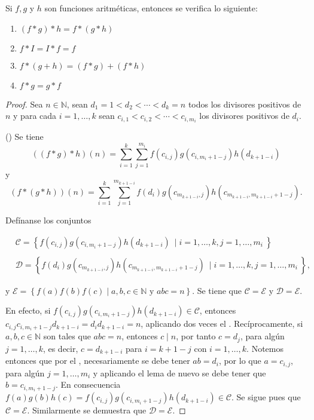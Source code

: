 \begin{proposition}
Si $f,g$ y $h$ son funciones aritméticas, entonces se verifica lo siguiente:

\begin{enumerate}[label=\textnormal{(\roman*)}]
	\item $(f*g)*h=f*(g*h)$
	\item $f*I=I*f=f$
	\item $f*(g+h)=(f*g)+(f*h)$
	\item $f*g=g*f$
\end{enumerate}
\end{proposition}
\begin{proof}
Sea $n\in\mathbb{N}$, sean $d_1=1<d_2<\cdots<d_k=n$ todos los divisores positivos de $n$ y para cada $i=1,\ldots,k$ sean $c_{i,1}<c_{i,2}<\cdots<c_{i,m_i}$ los divisores positivos de $d_i$.
\bigskip

({\scshape {}}) Se tiene
\begin{equation}\label{eqn:sum1}
	((f*g)*h)(n)=\sum_{i=1}^{k} \sum_{j=1}^{m_i} f(c_{i,j})g(c_{i,m_i+1-j})h(d_{k+1-i})
\end{equation}
y 
\begin{equation}\label{eqn:sum2}
	(f*(g*h))(n)=\sum_{i=1}^{k} \sum_{j=1}^{m_{k+1-i}} f(d_i)g(c_{m_{k+1-i},j})h(c_{m_{k+1-i},m_{k+1-i}+1-j}).
\end{equation}

Defínanse los conjuntos

\begin{align*}
	& \mathcal{C} = \left\{f(c_{i,j})g(c_{i,m_i+1-j})h(d_{k+1-i}) \: \mid i=1,\ldots,k,j=1,\ldots,m_i \: \right\} \\
	& \\
	& \mathcal{D} = \left\{f(d_i)g(c_{m_{k+1-i},j})h(c_{m_{k+1-i},m_{k+1-i}+1-j}) \: \mid i=1,\ldots,k,j=1,\ldots,m_i \: \right\},
\end{align*}

y $\mathcal{E} = \left\{f(a)f(b)f(c) \mid a,b,c\in\mathbb{N} \textrm{ y } a b c=n\right\}$. Se tiene que $\mathcal{C}=\mathcal{E}$ y $\mathcal{D}=\mathcal{E}$.
\bigskip

En efecto, si $f(c_{i,j})g(c_{i,m_i+1-j})h(d_{k+1-i}) \in \mathcal{C}$, entonces $c_{i,j}c_{i,m_i+1-j}d_{k+1-i}=d_i d_{k+1-i}=n$, aplicando dos veces el . Recíprocamente, si $a,b,c\in\mathbb{N}$ son tales que $a b c = n$, entonces $c \mid n$, por tanto $c=d_j$, para algún $j=1,\ldots,k$, es decir, $c=d_{k+1-i}$ para $i=k+1-j$ con $i=1,\ldots,k$. Notemos entonces que por el , necesariamente se debe tener $a b=d_i$, por lo que $a=c_{i,j}$, para algún $j=1,\ldots,m_i$ y aplicando el lema de nuevo se debe tener que $b=c_{i,m_i+1-j}$. En consecuencia $f(a)g(b)h(c)=f(c_{i,j})g(c_{i,m_i+1-j})h(d_{k+1-i})\in \mathcal{C}$. Se sigue pues que $\mathcal{C}=\mathcal{E}$. Similarmente se demuestra que $\mathcal{D}=\mathcal{E}$.
\bigskip


\end{proof}
